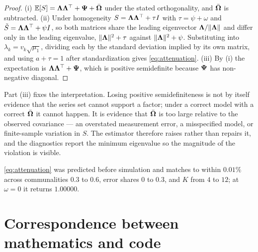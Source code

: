\documentclass[12pt,a4paper,oneside]{article}
\begin{document}
\begin{proof}
(i) $\mathbb{E}[S]=\bm{\Lambda}\bm{\Lambda}^\top+\bm{\Psi}+\bar{\bm{\Omega}}$ under the stated orthogonality, and
$\bar{\bm{\Omega}}$ is subtracted. (ii) Under homogeneity $S=\bm{\Lambda}\bm{\Lambda}^\top+\tau I$ with
$\tau=\psi+\omega$ and $\tilde{S}=\bm{\Lambda}\bm{\Lambda}^\top+\psi I$, so both matrices share
the leading eigenvector $\bm{\Lambda}/\|\bm{\Lambda}\|$ and differ only in the leading eigenvalue,
$\|\bm{\Lambda}\|^2+\tau$ against $\|\bm{\Lambda}\|^2+\psi$. Substituting into
$\lambda_k=v_k\sqrt{\mu_1}$, dividing each by the standard deviation implied by
its own matrix, and using $a+\tau=1$ after standardization gives
\eqref{eq:attenuation}. (iii) By (i) the expectation is $\bm{\Lambda}\bm{\Lambda}^\top+\bm{\Psi}$,
which is positive semidefinite because $\bm{\Psi}$ has non-negative diagonal.
\end{proof}

\begin{remark}
Part (iii) fixes the interpretation. Losing positive semidefiniteness is not by
itself evidence that the series set cannot support a factor; under a correct model
with a correct $\bar{\bm{\Omega}}$ it cannot happen. It is evidence that $\bar{\bm{\Omega}}$ is too
large relative to the observed covariance --- an overstated measurement error, a
misspecified model, or finite-sample variation in $S$. The estimator therefore
raises rather than repairs it, and the diagnostics report the minimum eigenvalue
so the magnitude of the violation is visible.
\end{remark}

\begin{remark}
\eqref{eq:attenuation} was predicted before simulation and matches to within
$0.01\%$ across communalities $0.3$ to $0.6$, error shares $0$ to $0.3$, and $K$
from $4$ to $12$; at $\omega=0$ it returns $1.00000$.
\end{remark}

\section{Correspondence between mathematics and code}
\end{document}
